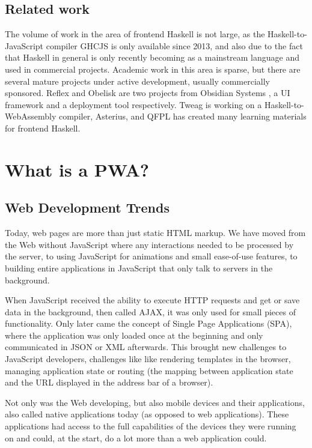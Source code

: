 \documentclass[english,odsaz]{fitthesis}
\begin{document}
\section{Related work}
\label{sec:org0f62089}
The volume of work in the area of frontend Haskell is not large, as the
Haskell-to-JavaScript compiler GHCJS is only available since 2013, and also due
to the fact that Haskell in general is only recently becoming as a mainstream
language and used in commercial projects. Academic work in this area is sparse,
but there are several mature projects under active development, usually
commercially sponsored. Reflex and Obelisk are two projects from Obsidian
Systems \cite{obsidian}, a UI framework and a deployment tool respectively. Tweag
\cite{tweag} is working on a Haskell-to-WebAssembly compiler, Asterius, and QFPL
\cite{qfpl} has created many learning materials for frontend Haskell.

\chapter{What is a PWA?}
\label{sec:org86bb77f}
\section{Web Development Trends}
\label{sec:orgdf47c2f}
Today, web pages are more than just static HTML markup. We have moved from
the Web without JavaScript where any interactions needed to be processed by the
server, to using JavaScript for animations and small ease-of-use features, to
building entire applications in JavaScript that only talk to servers in the
background.

When JavaScript received the ability to execute HTTP requests and get or save
data in the background, then called AJAX, it was only used for small pieces of
functionality. Only later came the concept of Single Page Applications (SPA),
where the application was only loaded once at the beginning and only
communicated in JSON or XML afterwards. This brought new challenges to
JavaScript developers, challenges like like rendering templates in the browser,
managing application state or routing (the mapping between application state and
the URL displayed in the address bar of a browser).

Not only was the Web developing, but also mobile devices and their applications,
also called native applications today (as opposed to web applications). These
applications had access to the full capabilities of the devices they were
running on and could, at the start, do a lot more than a web application
could.
\end{document}
